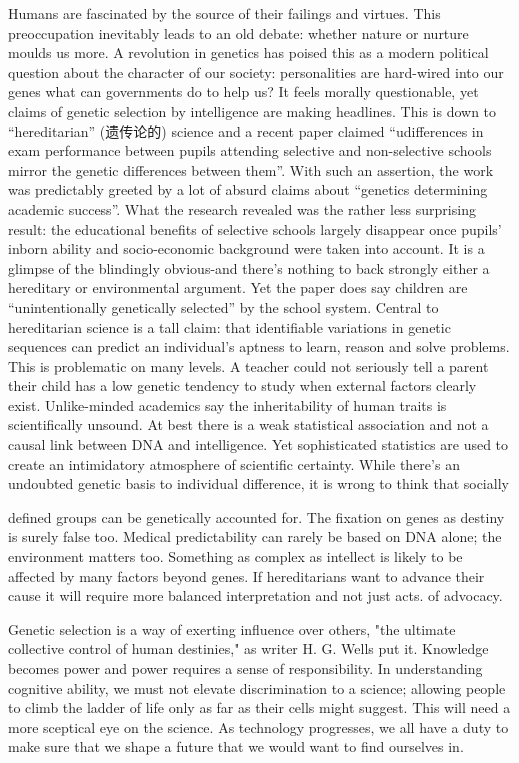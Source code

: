 \documentclass[UTF8,11pt]{ctexart}
\begin{document}
Humans are fascinated by the source of their failings and virtues. This preoccupation inevitably leads to an old debate: whether nature or nurture moulds us more. A revolution in genetics has poised this as a modern political question about the character of our society: personalities are hard-wired into our genes what can governments do to help us? It feels morally questionable, yet claims of genetic selection by intelligence are making headlines. This is down to “hereditarian” (遗传论的) science and a recent paper claimed “udifferences in exam performance between pupils attending selective and non-selective schools mirror the genetic differences between them”. With such an assertion, the work was predictably greeted by a lot of absurd claims about “genetics determining academic success”. What the research revealed was the rather less surprising result: the educational benefits of selective schools largely disappear once pupils' inborn ability and socio-economic background were taken into account. It is a glimpse of the blindingly obvious-and there's nothing to back strongly either a hereditary or environmental argument. Yet the paper does say children are “unintentionally genetically selected” by the school system. Central to hereditarian science is a tall claim: that identifiable variations in genetic sequences can predict an individual's aptness to learn, reason and solve problems. This is problematic on many levels. A teacher could not seriously tell a parent their child has a low genetic tendency to study when external factors clearly exist. Unlike-minded academics say the inheritability of human traits is scientifically unsound. At best there is a weak statistical association and not a causal link between DNA and intelligence. Yet sophisticated statistics are used to create an intimidatory atmosphere of scientific certainty. While there's an undoubted genetic basis to individual difference, it is wrong to think that socially


defined groups can be genetically accounted for. The fixation on genes as destiny is surely false too. Medical predictability can rarely be based on DNA alone; the environment matters too. Something as complex as intellect is likely to be affected by many factors beyond genes. If hereditarians want to advance their cause it will require more balanced interpretation and not just acts. of advocacy.


Genetic selection is a way of exerting influence over others, "the ultimate collective control of human destinies," as writer H. G. Wells put it. Knowledge becomes power and power requires a sense of responsibility. In understanding cognitive ability, we must not elevate discrimination to a science; allowing people to climb the ladder of life only as far as their cells might suggest. This will need a more sceptical eye on the science. As technology progresses, we all have a duty to make sure that we shape a future that we would want to find ourselves in.
\end{document}
